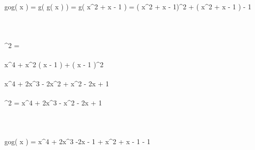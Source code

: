  \\ \\

 \\ \\

gog\left( x \right) = g\left( g\left( x \right) \right) = g\left( x^{2} + x - 1  \right) = \left( x^{2} + x - 1\right)^{2} + \left( x^{2} + x - 1 \right) - 1  \\ \\

 \\ \\

^{2} = \\ \\

\Rightarrow x^{4} + x^{2} \cdot \left( x - 1 \right) + \left( x - 1 \right)^{2}   \\ \\ 

\Rightarrow x^{4} + 2x^{3}  - 2x^{2} + x^{2} - 2x  + 1 \\ \\ 

^{2} = x^{4} + 2x^{3}  - x^{2} - 2x  + 1 \\ \\ 

 \\ \\ 

gog\left( x \right) = x^{4} + 2x^{3} -2x - 1 + x^{2} + x - 1 - 1 \\ \\

